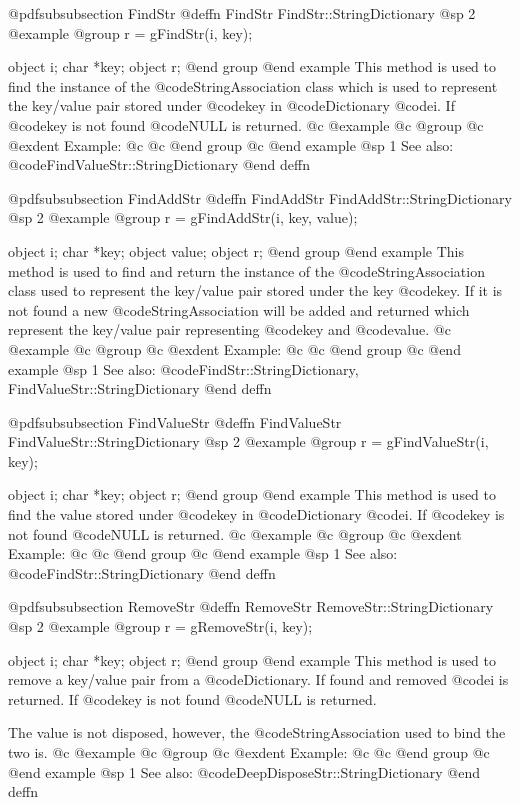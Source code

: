 @pdfsubsubsection {FindStr}
@deffn {FindStr} FindStr::StringDictionary
@sp 2
@example
@group
r = gFindStr(i, key);

object  i;
char    *key;
object  r;
@end group
@end example
This method is used to find the instance of the @code{StringAssociation}
class which is used to represent the key/value pair stored under
@code{key} in @code{Dictionary} @code{i}.  If @code{key} is not found
@code{NULL} is returned.
@c @example
@c @group
@c @exdent Example:
@c 
@c @end group
@c @end example
@sp 1
See also:  @code{FindValueStr::StringDictionary}
@end deffn










@pdfsubsubsection {FindAddStr}
@deffn {FindAddStr} FindAddStr::StringDictionary
@sp 2
@example
@group
r = gFindAddStr(i, key, value);

object  i;
char    *key;
object  value;
object  r;
@end group
@end example
This method is used to find and return the instance of the
@code{StringAssociation} class used to represent the key/value pair
stored under the key @code{key}.  If it is not found a new
@code{StringAssociation} will be added and returned which represent the
key/value pair representing @code{key} and @code{value}.
@c @example
@c @group
@c @exdent Example:
@c 
@c @end group
@c @end example
@sp 1
See also:  @code{FindStr::StringDictionary, FindValueStr::StringDictionary}
@end deffn









@pdfsubsubsection {FindValueStr}
@deffn {FindValueStr} FindValueStr::StringDictionary
@sp 2
@example
@group
r = gFindValueStr(i, key);

object  i;
char    *key;
object  r;
@end group
@end example
This method is used to find the value stored under @code{key} in
@code{Dictionary} @code{i}.  If @code{key} is not found @code{NULL} is
returned.
@c @example
@c @group
@c @exdent Example:
@c 
@c @end group
@c @end example
@sp 1
See also:  @code{FindStr::StringDictionary}
@end deffn











@pdfsubsubsection {RemoveStr}
@deffn {RemoveStr} RemoveStr::StringDictionary
@sp 2
@example
@group
r = gRemoveStr(i, key);

object  i;
char    *key;
object  r;
@end group
@end example
This method is used to remove a key/value pair from a @code{Dictionary}.
If found and removed @code{i} is returned.  If @code{key} is not found
@code{NULL} is returned.

The value is not disposed, however, the @code{StringAssociation} used to
bind the two is.
@c @example
@c @group
@c @exdent Example:
@c 
@c @end group
@c @end example
@sp 1
See also:  @code{DeepDisposeStr::StringDictionary}
@end deffn







